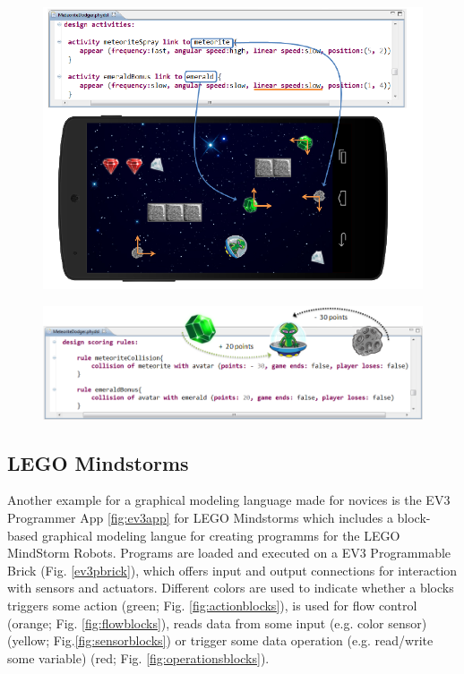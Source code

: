 \documentclass[runningheads,a4paper]{llncs}
\begin{document}
  \begin{figure}[H]
      \centering
      \includegraphics[width=\textwidth]{images/PhyDSL3.PNG}
      \label{activitiesdef}
    \end{figure}

\begin{figure}[H]
      \centering
      \includegraphics[width=\textwidth]{images/PhyDSL4.PNG}
      \label{rulesdef}
    \end{figure}

   \pagebreak
   
   \subsection{LEGO Mindstorms}
   Another example for a graphical modeling language made for novices is the EV3 Programmer App \ref{fig:ev3app}
   for LEGO Mindstorms which includes a block-based graphical modeling langue for creating programms
   for the LEGO MindStorm Robots. Programs are loaded and executed on a EV3 Programmable Brick (Fig. \ref{ev3pbrick}), 
   which offers input and output connections for interaction with sensors and actuators.
   Different colors are used to indicate whether a blocks triggers some action (green; Fig. \ref{fig:actionblocks}), is used for flow control (orange; Fig. \ref{fig:flowblocks}),
   reads data from some input (e.g. color sensor)(yellow; Fig.\ref{fig:sensorblocks}) or trigger some data operation (e.g. read/write some variable) (red; Fig. \ref{fig:operationsblocks}).
   
\end{document}
